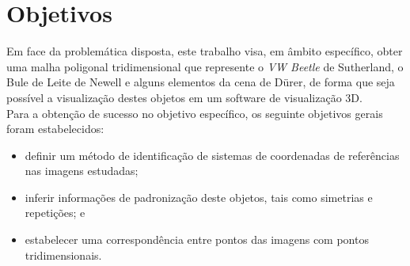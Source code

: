 \section{Objetivos}

	Em face da problemática disposta, este trabalho visa, em âmbito específico, obter uma malha poligonal tridimensional que represente o \textit{VW Beetle} de Sutherland, o Bule de Leite de Newell e alguns elementos da cena de Dürer, de forma que seja possível a visualização destes objetos em um software de visualização 3D. \\
	Para a obtenção de sucesso no objetivo específico, os seguinte objetivos gerais foram estabelecidos:
	\begin{itemize}
		\item definir um método de identificação de sistemas de coordenadas de referências nas imagens estudadas;
		\item inferir informações de padronização deste objetos, tais como simetrias e repetições; e
		\item estabelecer uma correspondência entre pontos das imagens com pontos tridimensionais.
	\end{itemize}